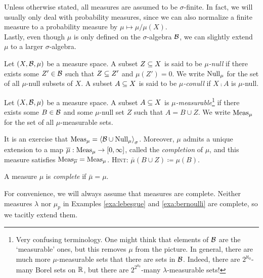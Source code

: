 \documentclass[reqno, twoside]{article}
\begin{document}
    Unless otherwise stated, all measures are assumed to be $\sigma$-finite. In fact, we will usually only deal with probability measures, since we can also normalize a finite measure to a probability measure by $\mu\mapsto\mu/\mu(X)$.\\

    Lastly, even though $\mu$ is only defined on the $\sigma$-algebra $\mathcal{B}$, we can slightly extend $\mu$ to a larger $\sigma$-algebra.

    \begin{definition}
        Let $(X,\mathcal{B},\mu)$ be a measure space. A subset $Z\subseteq X$ is said to be \textit{$\mu$-null} if there exists some $Z'\in\mathcal{B}$ such that $Z\subseteq Z'$ and $\mu(Z')=0$. We write $\operatorname{Null}_\mu$ for the set of all $\mu$-null subsets of $X$. A subset $A\subseteq X$ is said to be \textit{$\mu$-conull} if $X\comp A$ is $\mu$-null.
    \end{definition}

    \begin{definition}
        Let $(X,\mathcal{B},\mu)$ be a measure space. A subset $A\subseteq X$ is \textit{$\mu$-measurable}\footnote{Very confusing terminology. One might think that elements of $\mathcal{B}$ are the `measurable' ones, but this removes $\mu$ from the picture. In general, there are much more $\mu$-measurable sets that there are sets in $\mathcal{B}$. Indeed, there are $2^{\aleph_0}$-many Borel sets on $\mathbb{R}$, but there are $2^{2^{\aleph_0}}$-many $\lambda$-measurable sets!} if there exists some $B\in\mathcal{B}$ and some $\mu$-null set $Z$ such that $A=B\cup Z$. We write $\operatorname{Meas}_\mu$ for the set of all $\mu$-measurable sets.
    \end{definition}

    It is an exercise that $\operatorname{Meas}_\mu=\left\langle\mathcal{B}\cup\operatorname{Null}_\mu\right\rangle_\sigma$. Moreover, $\mu$ admits a unique extension to a map $\overline{\mu}:\operatorname{Meas}_\mu\to[0,\infty]$, called the \textit{completion} of $\mu$, and this measure satisfies $\operatorname{Meas}_{\overline{\mu}}=\operatorname{Meas}_\mu$. \textsc{Hint}: $\bar{\mu}(B\cup Z)\coloneqq\mu(B)$.

    \begin{definition}
        A measure $\mu$ is \textit{complete} if $\bar{\mu}=\mu$.
    \end{definition}

    For convenience, we will always assume that measures are complete. Neither measures $\lambda$ nor $\mu_p$ in Examples \ref{exa:lebesgue} and \ref{exa:bernoulli} are complete, so we tacitly extend them. \\
\end{document}
